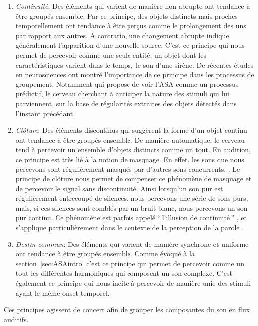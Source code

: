 \begin{enumerate}
\item \emph{Continuité}: Des éléments qui varient de manière non abrupte ont tendance à être groupés ensemble. Par ce principe, des objets distincts mais proches temporellement   ont tendance à être perçus comme le prolongement des uns par rapport aux autres. A contrario, une changement abrupte indique généralement l'apparition d'une nouvelle source. C'est ce principe qui nous permet de percevoir comme une seule entité, un objet dont les caractéristiques varient dans le temps,\eg~le son d'une sirène.
De récentes études en neurosciences ont montré l'importance de ce principe dans les processus de groupement. Notamment \citep{winkler2009modeling} qui propose de voir l'ASA comme un processus prédictif, le cerveau cherchant à anticiper la nature des stimuli qui lui parviennent, sur la base de régularités extraites des objets détectés dans l'instant précédant.
\item \emph{Clôture}: Des éléments discontinus qui suggèrent la forme d'un objet continu ont tendance à être groupés ensemble. De manière automatique, le cerveau tend à percevoir un ensemble d'objets distincts comme un tout. En audition, ce principe est très lié à la notion de masquage. En effet, les sons que nous percevons sont régulièrement masqués par d'autres sons concurrents,  . Le principe de clôture nous permet de compenser ce phénomène de masquage et de percevoir le signal sans discontinuité. Ainsi lorsqu'un son pur est régulièrement entrecoupé de silences, nous percevons une série de sons purs, mais, si ces silences sont comblés par un bruit blanc, nous percevons un son pur continu. Ce phénomène est parfois appelé ``\,l’illusion de continuité\,'' \citep{dannenbring1976perceived}, et s'applique particulièrement dans le contexte de la perception de la parole \citep{carlyon2002continuity}.
\item \emph{Destin commun}: Des éléments qui varient de manière synchrone et uniforme ont tendance à être groupés ensemble. Comme évoqué à la section~\ref{sec:ASAintro} c'est ce principe qui permet de percevoir comme un tout les différentes harmoniques qui composent un son complexe. C'est également ce principe qui nous incite à percevoir de manière unie des stimuli ayant le même onset temporel.
\end{enumerate}

Ces principes agissent de concert afin de grouper les composantes du son en flux auditifs.

